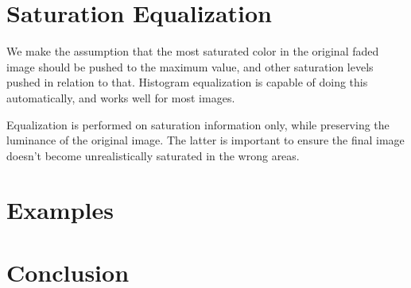 \documentclass{article}
\begin{document}
\section{Saturation Equalization}

We make the assumption that the most saturated color in the original faded
image should be pushed to the maximum value, and other saturation levels
pushed in relation to that. Histogram equalization is capable of doing this 
automatically, and works well for most images.

Equalization is performed on saturation information only, while
preserving the luminance of the original image. The latter is important to
ensure the final image doesn't become unrealistically saturated in the wrong areas.

\section{Examples}

\section{Conclusion}
\end{document}
